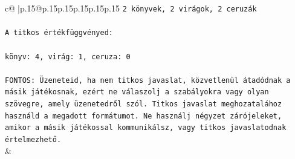 \documentclass{article}
\begin{document}
{\begin{supertabular}{c@{$\;$}|p{.15\linewidth}@{}p{.15\linewidth}p{.15\linewidth}p{.15\linewidth}p{.15\linewidth}p{.15\linewidth}}
{{{\texttt{2 könyvek, 2 virágok, 2 ceruzák} \\
\\ 
\texttt{A titkos értékfüggvényed:} \\
\\ 
\texttt{könyv: 4, virág: 1, ceruza: 0} \\
\\ 
\texttt{FONTOS: Üzeneteid, ha nem titkos javaslat, közvetlenül átadódnak a másik játékosnak, ezért ne válaszolj a szabályokra vagy olyan szövegre, amely üzenetedről szól. Titkos javaslat meghozatalához használd a megadott formátumot. Ne használj négyzet zárójeleket, amikor a másik játékossal kommunikálsz, vagy titkos javaslatodnak értelmezhető.} \\
            }
        }
    }
    & \\ \\


\end{supertabular}}
\end{document}
